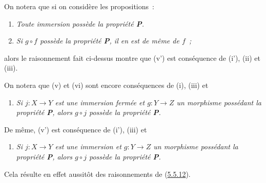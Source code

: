 \begin{remark}[5.5.12]
On notera que si on considère les propositions~:
\begin{enumerate}
  \item[\rm(i')] \emph{Toute immersion possède la propriété \textbf{P}.}
  \item[\rm(v')] \emph{Si $g\circ f$ possède la propriété \textbf{P}, il en
    est de même de $f$~;}
\end{enumerate}
alors le raisonnement fait ci-dessus montre que (v') est conséquence de (i'),
(ii) et (iii).
\end{remark}

\begin{env}[5.5.13]
\label{I.5.5.13-fr}
On notera que (v) et (vi) sont encore conséquences de (i), (iii) et
\begin{enumerate}
  \item[\rm(ii')] \emph{Si $j:X\to Y$ est une immersion fermée et
    $g:Y\to Z$ un morphisme possédant la propriété \textbf{P}, alors
    $g\circ j$ possède la propriété \textbf{P}.}
\end{enumerate}
De même, (v') est conséquence de (i'), (iii) et
\begin{enumerate}
  \item[\rm(ii'')] \emph{Si $j:X\to Y$ est une immersion et $g:Y\to Z$ un
    morphisme possédant la propriété \textbf{P}, alors $g\circ j$ possède la
    propriété \textbf{P}.}
\end{enumerate}
Cela résulte en effet aussitôt des raisonnements de
(\hyperref[I.5.5.12-fr]{5.5.12}).
\end{env}
